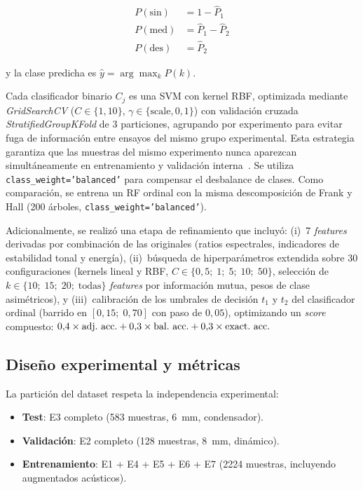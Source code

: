 \documentclass[10pt,twocolumn]{article}
\begin{document}
\begin{align}
P(\text{sin}) &= 1 - \hat{P}_1 \\
P(\text{med}) &= \hat{P}_1 - \hat{P}_2 \\
P(\text{des}) &= \hat{P}_2
\end{align}

\noindent y la clase predicha es $\hat{y} = \arg\max_k P(k)$.

Cada clasificador binario $C_j$ es una SVM con kernel RBF, optimizada
mediante \textit{GridSearchCV} ($C \in \{1, 10\}$,
$\gamma \in \{\text{scale}, 0{,}1\}$) con validación cruzada
\textit{StratifiedGroupKFold} de 3 particiones, agrupando por experimento
para evitar fuga de información entre ensayos del mismo grupo
experimental. Esta estrategia garantiza que las muestras del mismo
experimento nunca aparezcan simultáneamente en entrenamiento y validación
interna~\cite{montgomery2013}. Se utiliza
\texttt{class\_weight='balanced'} para compensar el desbalance de clases.
Como comparación, se entrena un RF ordinal con la misma descomposición de
Frank y Hall (200 árboles, \texttt{class\_weight='balanced'}).

Adicionalmente, se realizó una etapa de refinamiento que incluyó: (i)~7
\textit{features} derivadas por combinación de las originales (ratios
espectrales, indicadores de estabilidad tonal y energía), (ii)~búsqueda
de hiperparámetros extendida sobre 30 configuraciones (kernels lineal y
RBF, $C \in \{0{,}5;\; 1;\; 5;\; 10;\; 50\}$, selección de $k \in
\{10;\; 15;\; 20;\; \text{todas}\}$ \textit{features} por información
mutua, pesos de clase asimétricos), y (iii)~calibración de los umbrales
de decisión $t_1$ y $t_2$ del clasificador ordinal (barrido en
$[0{,}15;\; 0{,}70]$ con paso de $0{,}05$), optimizando un \textit{score}
compuesto: $0{,}4 \times \text{adj.\ acc.} + 0{,}3 \times \text{bal.\
acc.} + 0{,}3 \times \text{exact.\ acc.}$

\subsection{Diseño experimental y métricas}
\label{sec:diseno}

La partición del dataset respeta la independencia experimental:

\begin{itemize}
  \item \textbf{Test}: E3 completo (583 muestras, 6~mm, condensador).
  \item \textbf{Validación}: E2 completo (128 muestras, 8~mm, dinámico).
  \item \textbf{Entrenamiento}: E1 + E4 + E5 + E6 + E7 (2224 muestras,
    incluyendo augmentados acústicos).
\end{itemize}
\end{document}
